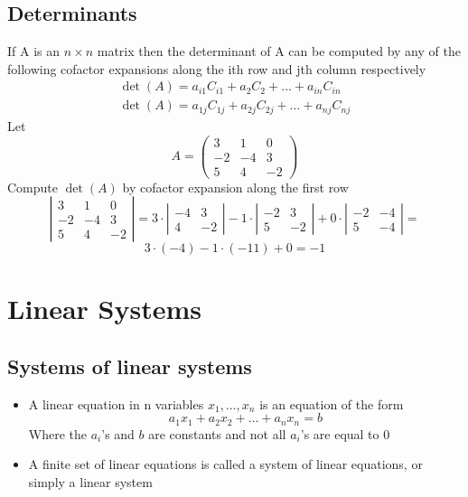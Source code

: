\documentclass{article}[18pt]
\begin{document}
\subsection{Determinants}
If A is an $n\times n$ matrix then the determinant of A can be computed by any of the following cofactor expansions along the ith row and jth column respectively
\[
\begin{array}{l}{\operatorname{det}(A)=a_{i 1} C_{i 1}+a_{2} C_{2}+\ldots+a_{i n} C_{i n}} \\ {\operatorname{det}(A)=a_{1 j} C_{1 j}+a_{2 j} C_{2 j}+\ldots+a_{n j} C_{n j}}\end{array}
\]
Let
\[
A=\left( \begin{array}{rrr}{3} & {1} & {0} \\ {-2} & {-4} & {3} \\ {5} & {4} & {-2}\end{array}\right)
\]
Compute $\det(A)$ by cofactor expansion along the first row
\[
\left| \begin{array}{rrr}{3} & {1} & {0} \\ {-2} & {-4} & {3} \\ {5} & {4} & {-2}\end{array}\right|=3 \cdot \left| \begin{array}{rr}{-4} & {3} \\ {4} & {-2}\end{array}\right|-1 \cdot \left| \begin{array}{rr}{-2} & {3} \\ {5} & {-2}\end{array}\right|+0 \cdot \left| \begin{array}{rr}{-2} & {-4} \\ {5} & {-4}\end{array}\right|=
\]
\[
3 \cdot(-4)-1 \cdot(-11)+0=-1
\]
\section{Linear Systems}
\subsection{Systems of linear systems}
\begin{itemize}
	\item A linear equation in n variables $x_1,\ldots, x_n$ is an equation of the form 
	\[
	a_{1} x_{1}+a_{2} x_{2}+\ldots+a_{n} x_{n}=b
	\]
	Where the $a_i$'s and $b$ are constants and not all $a_i$'s are equal to 0
	\item A finite set of linear equations is called a system of linear equations, or simply a linear system
\end{itemize}
\end{document}
